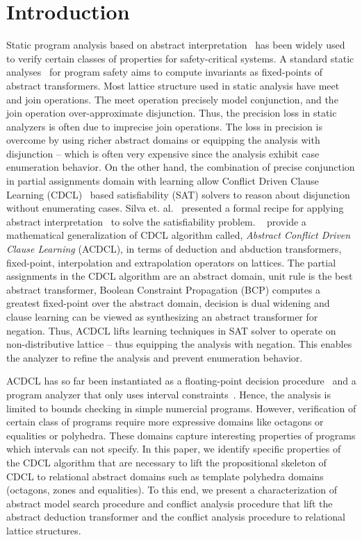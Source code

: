 \section{Introduction}
%
Static program analysis based on abstract 
interpretation~\cite{DBLP:conf/emsoft/Cousot07} has been widely used to
verify certain classes of properties for safety-critical systems.  A 
standard static analyses~\cite{se2011} for program safety aims to compute 
invariants as fixed-points of abstract transformers.  Most lattice structure 
used in static analysis have meet and join operations.  The meet operation 
precisely model conjunction, and the join operation over-approximate 
disjunction. Thus, the precision loss in static analyzers is often 
due to imprecise join operations. The loss in precision is overcome 
by using richer abstract domains or equipping the analysis with disjunction --
which is often very expensive since the analysis exhibit case enumeration 
behavior. 
On the other hand, the combination of precise conjunction in partial assignments 
domain with learning allow Conflict Driven Clause Learning (CDCL)~\cite{cdcl}
based satisfiability (SAT) solvers to reason about disjunction without 
enumerating cases.  Silva et. al.~\cite{tacas12, sas12, dhk2013-popl} presented 
a formal recipe for applying abstract interpretation~\cite{se2011} to solve the 
satisfiability problem.  ~\cite{sas12} provide a mathematical generalization 
of CDCL algorithm called, {\em Abstract Conflict Driven Clause Learning} (ACDCL), 
in terms of deduction and abduction transformers, fixed-point, interpolation 
and extrapolation operators on lattices.  The partial assignments in the 
CDCL algorithm are an abstract domain, unit rule is the best abstract 
transformer,  Boolean Constraint Propagation (BCP) computes a greatest fixed-point 
over the abstract domain, decision is dual widening and clause learning can be 
viewed as synthesizing an abstract transformer for negation.  Thus, ACDCL 
lifts learning techniques in SAT solver to operate on non-distributive 
lattice -- thus equipping the analysis with negation. This enables the 
analyzer to refine the analysis and prevent enumeration behavior.

ACDCL has so far been instantiated as a floating-point
decision procedure~\cite{DBLP:journals/fmsd/BrainDGHK14} and a program analyzer 
that only uses interval constraints~\cite{tacas12}.  Hence, the analysis is 
limited to bounds checking in simple numercial programs.  However, verification of 
certain class of programs require more expressive domains like octagons or 
equalities or polyhedra.  These domains capture interesting properties of
programs which intervals can not specify.  In this paper, we identify specific 
properties of the CDCL algorithm that are necessary to lift the propositional 
skeleton of CDCL to relational abstract domains such as template polyhedra 
domains~\cite{sriram} (octagons, zones and equalities).  To this end, we 
present a characterization of abstract model search procedure and conflict 
analysis procedure that lift the abstract deduction transformer and the conflict 
analysis procedure to relational lattice structures. 
